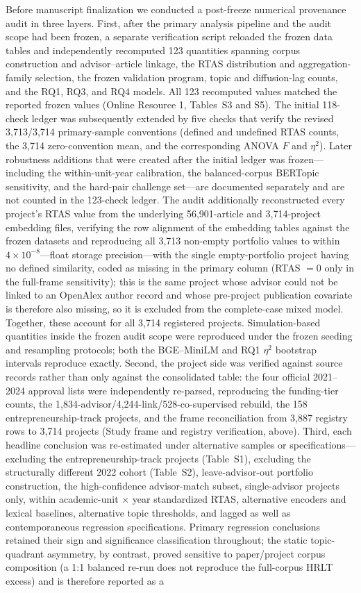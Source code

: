 Before manuscript finalization we conducted a post-freeze numerical provenance audit in three layers. First, after the primary analysis pipeline and the audit scope had been frozen, a separate verification script reloaded the frozen data tables and independently recomputed 123 quantities spanning corpus construction and advisor--article linkage, the RTAS distribution and aggregation-family selection, the frozen validation program, topic and diffusion-lag counts, and the RQ1, RQ3, and RQ4 models. All 123 recomputed values matched the reported frozen values (Online Resource 1, Tables~S3 and S5). The initial 118-check ledger was subsequently extended by five checks that verify the revised 3,713/3,714 primary-sample conventions (defined and undefined RTAS counts, the 3,714 zero-convention mean, and the corresponding ANOVA $F$ and $\eta^2$). Later robustness additions that were created after the initial ledger was frozen---including the within-unit-year calibration, the balanced-corpus BERTopic sensitivity, and the hard-pair challenge set---are documented separately and are not counted in the 123-check ledger. The audit additionally reconstructed every project's RTAS value from the underlying 56,901-article and 3,714-project embedding files, verifying the row alignment of the embedding tables against the frozen datasets and reproducing all 3,713 non-empty portfolio values to within $4\times10^{-8}$---float storage precision---with the single empty-portfolio project having no defined similarity, coded as missing in the primary column (RTAS $=0$ only in the full-frame sensitivity); this is the same project whose advisor could not be linked to an OpenAlex author record and whose pre-project publication covariate is therefore also missing, so it is excluded from the complete-case mixed model. Together, these account for all 3,714 registered projects. Simulation-based quantities inside the frozen audit scope were reproduced under the frozen seeding and resampling protocols; both the BGE--MiniLM and RQ1 $\eta^2$ bootstrap intervals reproduce exactly. Second, the project side was verified against source records rather than only against the consolidated table: the four official 2021--2024 approval lists were independently re-parsed, reproducing the funding-tier counts, the 1,834-advisor/4,244-link/528-co-supervised rebuild, the 158 entrepreneurship-track projects, and the frame reconciliation from 3,887 registry rows to 3,714 projects (Study frame and registry verification, above). Third, each headline conclusion was re-estimated under alternative samples or specifications---excluding the entrepreneurship-track projects (Table~S1), excluding the structurally different 2022 cohort (Table~S2), leave-advisor-out portfolio construction, the high-confidence advisor-match subset, single-advisor projects only, within academic-unit $\times$ year standardized RTAS, alternative encoders and lexical baselines, alternative topic thresholds, and lagged as well as contemporaneous regression specifications. Primary regression conclusions retained their sign and significance classification throughout; the static topic-quadrant asymmetry, by contrast, proved sensitive to paper/project corpus composition (a 1:1 balanced re-run does not reproduce the full-corpus HRLT excess) and is therefore reported as a 